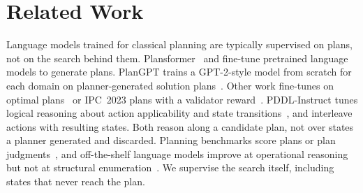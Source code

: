 \section{Related Work}
\label{sec:related}

Language models trained for classical planning are typically supervised on plans, not on the search behind them. Plansformer~\citep{pallagani2022plansformer} and \citet{pallagani2023understanding} fine-tune pretrained language models to generate plans. PlanGPT trains a GPT-2-style model from scratch for each domain on planner-generated solution plans~\citep{rossetti2024learning}. Other work fine-tunes on optimal plans~\citep{bohnet2024exploring,li2024unlocking} or IPC~2023 plans with a validator reward~\citep{belcamino2026generalization}. PDDL-Instruct tunes logical reasoning about action applicability and state transitions~\citep{verma2025teaching}, and \citet{emami2026close} interleave actions with resulting states. Both reason along a candidate plan, not over states a planner generated and discarded. Planning benchmarks score plans or plan judgments~\citep{valmeekam2023planbench,valmeekam2023critical,stein2025autoplanbench,kokel2026acpbenchhard}, and off-the-shelf language models improve at operational reasoning but not at structural enumeration~\citep{huang2026twodistinct}. We supervise the search itself, including states that never reach the plan.
